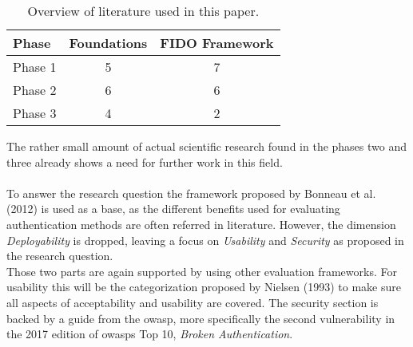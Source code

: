 \begin{table}[ht]
    \centering
    \caption{Overview of literature used in this paper.}
    \label{tab:literature_review}
    \begin{tabular}{ l | c | c }
        \textbf{Phase} & \textbf{Foundations} & \textbf{FIDO Framework}\\
        \hline
        Phase 1 & 5 & 7\\
        Phase 2 & 6 & 6\\
        Phase 3 & 4 & 2\\
    \end{tabular}
\end{table}

\noindent The rather small amount of actual scientific research found in the phases two and three already shows a need for further work in this field.\\
\\
To answer the research question the framework proposed by Bonneau et al. (2012) \cite{bonneau2012} is used as a base, as the different benefits used for evaluating authentication methods are often referred in literature. However, the dimension \emph{Deployability} is dropped, leaving a focus on \emph{Usability} and \emph{Security} as proposed in the research question.\\
Those two parts are again supported by using other evaluation frameworks. For usability this will be the categorization proposed by Nielsen (1993) to make sure all aspects of acceptability and usability are covered. The security section is backed by a guide from the \ac{owasp}, more specifically the second vulnerability in the 2017 edition of \acp{owasp} Top 10, \emph{Broken Authentication}.